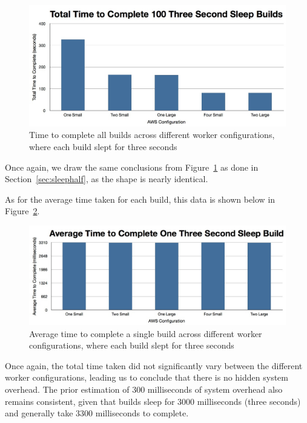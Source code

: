 \documentclass{scrartcl}
\begin{document}
\begin{figure}[h!]
  \begin{center}
    \includegraphics[scale=0.45]{raw_data/sleep3/time_to_complete_all.jpg}
  \end{center}
  \caption{Time to complete all builds across different worker configurations, where each build slept for three seconds}
  \label{fig:sleep3_all}
\end{figure}

Once again, we draw the same conclusions from Figure~\ref{fig:sleep3_all} as done in Section~\ref{sec:sleephalf}, as the shape is nearly identical.

As for the average time taken for each build, this data is shown below in Figure~\ref{fig:sleep3_each}.

\begin{figure}[h!]
  \begin{center}
    \includegraphics[scale=0.45]{raw_data/sleep3/time_to_complete_each.jpg}
  \end{center}
  \caption{Average time to complete a single build across different worker configurations, where each build slept for three seconds}
  \label{fig:sleep3_each}
\end{figure}

Once again, the total time taken did not significantly vary between the different worker configurations, leading us to conclude that there is no hidden system overhead.
The prior estimation of 300 milliseconds of system overhead also remains consistent, given that builds sleep for 3000 milliseconds (three seconds) and generally take 3300 milliseconds to complete.
\end{document}
